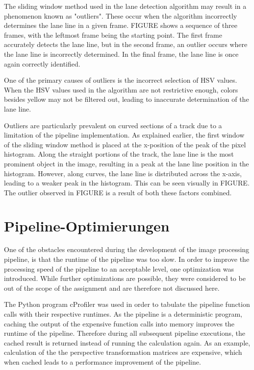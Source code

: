 \documentclass[arbeit=studie,oneside,BCOR=12mm]{ArbeitRST}
\begin{document}
\fi

The sliding window method used in the lane detection algorithm may result in a
phenomenon known as "outliers". These occur when the algorithm incorrectly
determines the lane line in a given frame. FIGURE shows a sequence of three
frames, with the leftmost frame being the starting point. The first frame
accurately detects the lane line, but in the second frame, an outlier occurs
where the lane line is incorrectly determined. In the final frame, the lane
line is once again correctly identified.

One of the primary causes of outliers is the incorrect selection of HSV values.
When the HSV values used in the algorithm are not restrictive enough, colors
besides yellow may not be filtered out, leading to inaccurate determination of
the lane line.

Outliers are particularly prevalent on curved sections of a track due to a
limitation of the pipeline implementation. As explained earlier, the first
window of the sliding window method is placed at the x-position of the peak of
the pixel histogram. Along the straight portions of the track, the lane line is
the most prominent object in the image, resulting in a peak at the lane line
position in the histogram. However, along curves, the lane line is distributed
across the x-axis, leading to a weaker peak in the histogram. This can be seen
visually in FIGURE. The outlier observed in FIGURE is a result of both these
factors combined.

\section{Pipeline-Optimierungen}

One of the obstacles encountered during the development of the image processing
pipeline, is that the runtime of the pipeline was too slow. In order to improve
the processing speed of the pipeline to an acceptable level, one optimization
was introduced. While further optimizations are possible, they were considered
to be out of the scope of the assignment and are therefore not discussed here.

The Python program cProfiler was used in order to tabulate the pipeline
function calls with their respective runtimes. As the pipeline is a
deterministic program, caching the output of the expensive function calls into
memory improves the runtime of the pipeline. Therefore during all subsequent
pipeline executions, the cached result is returned instead of running the
calculation again. As an example, calculation of the the perspective
transformation matrices are expensive, which when cached leads to a performance
improvement of the pipeline.
\end{document}
